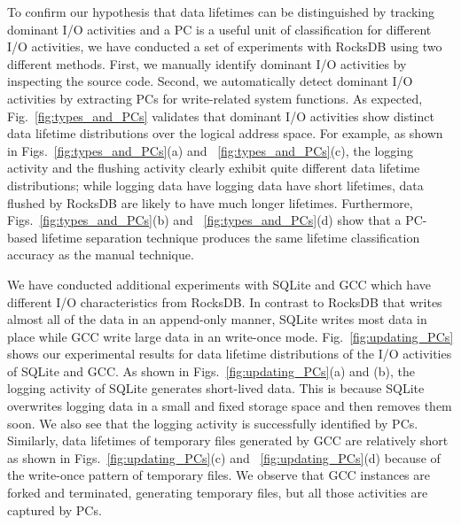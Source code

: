 To confirm our hypothesis that data lifetimes can be distinguished by tracking
dominant I/O activities and a PC is a useful unit of classification for 
different I/O activities,
we have conducted a set of experiments with RocksDB using two
different methods.  First, we manually identify dominant I/O activities by
inspecting the source code.  Second, we automatically detect dominant I/O
activities by extracting PCs for write-related system functions.
{\color{blue}
As expected, Fig.~\ref{fig:types_and_PCs} validates that dominant I/O activities 
show distinct data lifetime distributions over the logical address space.
For example, as shown in Figs.~\ref{fig:types_and_PCs}(a) and ~\ref{fig:types_and_PCs}(c), 
the logging activity and the flushing activity clearly exhibit quite different 
data lifetime distributions; while logging data have logging data have short lifetimes, 
data flushed by RocksDB are likely to have much longer lifetimes.
Furthermore, Figs.~\ref{fig:types_and_PCs}(b) and ~\ref{fig:types_and_PCs}(d) show that 
a PC-based lifetime separation technique produces the same lifetime 
classification accuracy as the manual technique. 
}

We have conducted additional experiments with SQLite and GCC which have
different I/O characteristics from RocksDB. In contrast to RocksDB that writes
almost all of the data in an append-only manner, SQLite 
writes most data in place while GCC write large data in an write-once mode.
Fig.~\ref{fig:updating_PCs} 
shows our experimental results for data lifetime distributions of the I/O
activities of SQLite and GCC.
As shown in Figs.~\ref{fig:updating_PCs}(a) and (b), the logging activity of
SQLite generates short-lived data.  This is because SQLite overwrites logging
data in a small and fixed storage space and then removes them soon.  We also
see that the logging activity is successfully identified by PCs. Similarly,
data lifetimes of temporary files generated by GCC are 
relatively short as shown in Figs.~\ref{fig:updating_PCs}(c) and ~\ref{fig:updating_PCs}(d) 
because of the write-once pattern of temporary files.
We observe that GCC
instances are forked and terminated, generating temporary files, but all those
activities are captured by PCs. 

